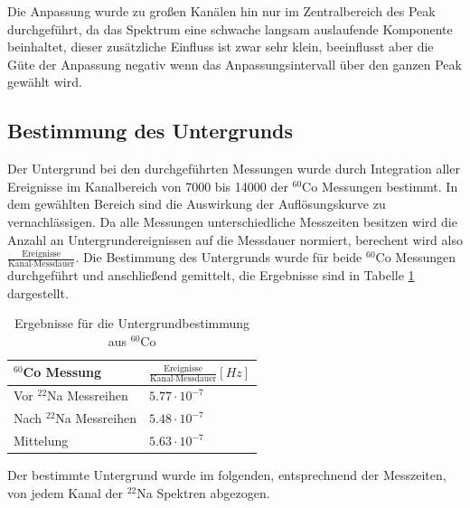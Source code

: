 \documentclass[a4paper,12pt]{article}
\begin{document}
Die Anpassung wurde zu großen Kanälen hin nur im Zentralbereich des Peak durchgeführt, da das Spektrum eine schwache langsam auslaufende Komponente beinhaltet,
dieser zusätzliche Einfluss ist zwar sehr klein, beeinflusst aber die Güte der Anpassung negativ wenn das Anpassungsintervall über den ganzen Peak gewählt wird.
\subsection{Bestimmung des Untergrunds}
Der Untergrund bei den durchgeführten Messungen wurde durch Integration aller Ereignisse im Kanalbereich von 7000 bis 14000 der $^{60}$Co Messungen bestimmt. 
In dem gewählten Bereich sind die Auswirkung der Auflösungskurve zu vernachlässigen. Da alle
Messungen unterschiedliche Messzeiten besitzen wird die Anzahl
an Untergrundereignissen auf die Messdauer normiert, berechent wird also
$\frac{\text{Ereignisse}}{\text{Kanal}\cdot \text{Messdauer}}$. Die Bestimmung des Untergrunds wurde für beide
 $^{60}$Co Messungen durchgeführt und anschließend gemittelt, die Ergebnisse sind in Tabelle \ref{tab:background} dargestellt.
 
 \begin{table}[h]
	\begin{tabular}{l |l }
		$^{60}$Co  Messung & $\frac{\text{Ereignisse}}{\text{Kanal} \cdot \text{Messdauer}} [\si{Hz}]$ \\
		\hline
		Vor $^{22}$Na Messreihen & $5.77 \cdot 10^{-7}$ \\
		Nach $^{22}$Na Messreihen &$ 5.48 \cdot 10^{-7}$\\
		\hline
		\hline
		Mittelung & $5.63 \cdot 10^{-7}$
	\end{tabular}
	\centering
	\caption{Ergebnisse für die Untergrundbestimmung aus $^{60}$Co}
	\label{tab:background}
\end{table}
 Der bestimmte Untergrund wurde im folgenden, entsprechnend der Messzeiten, von jedem Kanal der
 $^{22}$Na Spektren abgezogen.
\end{document}

